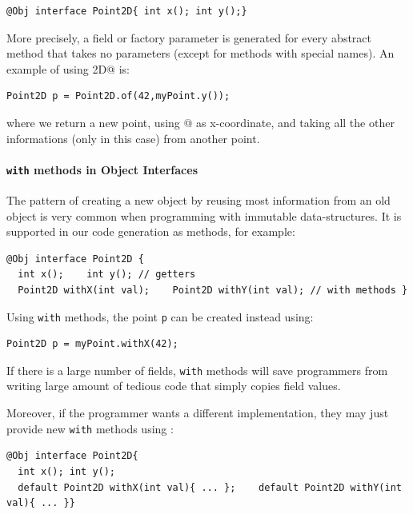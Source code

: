 \begin{lstlisting}
@Obj interface Point2D{ int x(); int y();}
\end{lstlisting}

\noindent More precisely, a field or factory parameter is generated for every
abstract method that takes no parameters (except for methods with special
names). An example of using \Q@Point2D@ is:
\begin{lstlisting}
Point2D p = Point2D.of(42,myPoint.y());
\end{lstlisting}
\noindent where we return a new point, using @ as x-coordinate,
and taking all the other informations (only \Q@y@ in this case) from
another point.

\paragraph{\texttt{with} methods in Object Interfaces}
The pattern of creating a new object by reusing most information from an old
object is very common when programming with immutable data-structures. It is
supported in our code generation as \Q@with@ methods, for example:
\begin{lstlisting}
@Obj interface Point2D { 
  int x();    int y(); // getters
  Point2D withX(int val);    Point2D withY(int val); // with methods }
\end{lstlisting}

\noindent Using \texttt{with} methods, the point \texttt{p} can be created instead using:

\begin{lstlisting}
Point2D p = myPoint.withX(42);
\end{lstlisting}

\noindent If there is a large number of fields, \texttt{with} methods
will save programmers from writing large amount of tedious code that
simply copies field values. 

Moreover, if the programmer wants a different implementation, they may 
just provide new \texttt{with} methods using \Q@default@:
\begin{lstlisting}
@Obj interface Point2D{ 
  int x(); int y();
  default Point2D withX(int val){ ... };    default Point2D withY(int val){ ... }}
\end{lstlisting}

